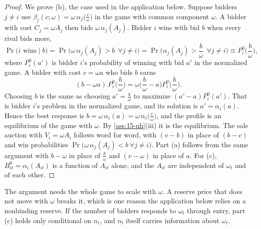 \begin{proof}
We prove (b), the case used in the application below. Suppose bidders $j\neq i$ use
$\beta_j(c;\omega)=\omega\,\alpha_j\big(\frac{c}{\omega}\big)$ in the game with common component
$\omega$. A bidder with cost $C_j=\omega A_j$ then bids $\omega\,\alpha_j(A_j)$. Bidder $i$ wins with
bid $b$ when every rival bids more,
\[
\Pr\big(\text{$i$ wins}\mid b\big)=\Pr\big(\omega\,\alpha_j(A_j)>b\ \ \forall j\neq i\big)
=\Pr\Big(\alpha_j(A_j)>\frac{b}{\omega}\ \ \forall j\neq i\Big)\equiv P^0_i\Big(\frac{b}{\omega}\Big),
\]
where $P^0_i(a')$ is bidder $i$'s probability of winning with bid $a'$ in the normalized game. A bidder
with cost $c=\omega a$ who bids $b$ earns
\[
(b-\omega a)\,P^0_i\Big(\frac{b}{\omega}\Big)=\omega\Big(\frac{b}{\omega}-a\Big)P^0_i\Big(\frac{b}{\omega}\Big).
\]
Choosing $b$ is the same as choosing $a'=\frac{b}{\omega}$ to maximize $(a'-a)P^0_i(a')$. That is
bidder $i$'s problem in the normalized game, and its solution is $a'=\alpha_i(a)$. Hence the best
response is $b=\omega\,\alpha_i(a)=\omega\,\alpha_i\big(\frac{c}{\omega}\big)$, and the profile is an
equilibrium of the game with $\omega$. By \cref{ass:15-uh}(iii) it is the equilibrium. The sale
auction with $V_i=\omega A_i$ follows word for word, with $(v-b)$ in place of $(b-c)$ and win
probabilities $\Pr\big(\omega\,\alpha_j(A_j)<b\ \forall j\neq i\big)$. Part (a)
follows from the same argument with $b-\omega$ in place of $\frac{b}{\omega}$ and $(v-\omega)$ in place
of $a$. For (c), $B^0_{it}=\alpha_i(A_{it})$ is a function of $A_{it}$ alone, and the $A_{it}$ are
independent of $\omega_t$ and of each other.
\end{proof}

The argument needs the whole game to scale with $\omega$. A reserve price that does not move with
$\omega$ breaks it, which is one reason the application below relies on a nonbinding reserve. If the
number of bidders responds to $\omega_t$ through entry, part (c) holds only conditional on $n_t$, and
$n_t$ itself carries information about $\omega_t$.

